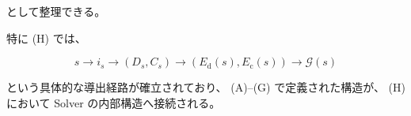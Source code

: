 \documentclass[a4paper,11pt]{article}
\newcommand{\Eval}{\mathcal{G}}
\begin{document}
として整理できる。

特に (H) では、

\begin{equation}
    \boxed{
        s
        \longrightarrow
        i_s
        \longrightarrow
        (D_s,C_s)
        \longrightarrow
        \left(
            E_{\mathrm d}(s),
            E_{\mathrm c}(s)
        \right)
        \longrightarrow
        \Eval(s)
    }
\end{equation}

という具体的な導出経路が確立されており、
(A)--(G) で定義された構造が、
(H) において Solver の内部構造へ接続される。
\end{document}
